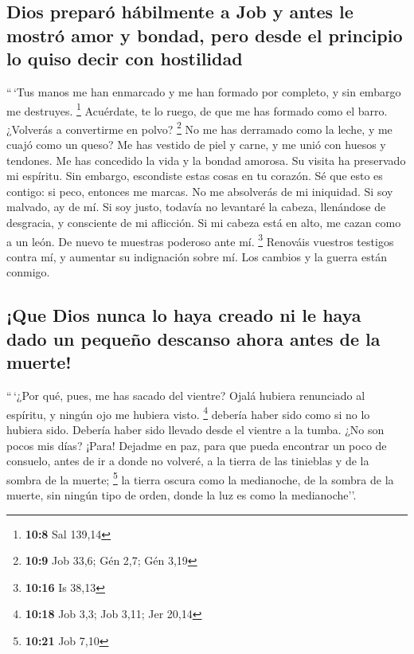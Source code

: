 \begin{paracol}{2}
\hypertarget{dios-preparuxf3-huxe1bilmente-a-job-y-antes-le-mostruxf3-amor-y-bondad-pero-desde-el-principio-lo-quiso-decir-con-hostilidad}{%
\subsection{Dios preparó hábilmente a Job y antes le mostró amor y
bondad, pero desde el principio lo quiso decir con
hostilidad}\label{dios-preparuxf3-huxe1bilmente-a-job-y-antes-le-mostruxf3-amor-y-bondad-pero-desde-el-principio-lo-quiso-decir-con-hostilidad}}

 ``\,`Tus manos me han enmarcado y me han formado por
completo, y sin embargo me destruyes. \footnote{\textbf{10:8} Sal 139,14}
 Acuérdate, te lo ruego, de que me has formado como el
barro. ¿Volverás a convertirme en polvo? \footnote{\textbf{10:9} Job
  33,6; Gén 2,7; Gén 3,19}  No me has derramado como la
leche, y me cuajó como un queso?  Me has vestido de piel
y carne, y me unió con huesos y tendones.  Me has
concedido la vida y la bondad amorosa. Su visita ha preservado mi
espíritu.  Sin embargo, escondiste estas cosas en tu
corazón. Sé que esto es contigo:  si peco, entonces me
marcas. No me absolverás de mi iniquidad.  Si soy
malvado, ay de mí. Si soy justo, todavía no levantaré la cabeza,
llenándose de desgracia, y consciente de mi aflicción. 
Si mi cabeza está en alto, me cazan como a un león. De nuevo te muestras
poderoso ante mí. \footnote{\textbf{10:16} Is 38,13} 
Renováis vuestros testigos contra mí, y aumentar su indignación sobre
mí. Los cambios y la guerra están conmigo.

\hypertarget{que-dios-nunca-lo-haya-creado-ni-le-haya-dado-un-pequeuxf1o-descanso-ahora-antes-de-la-muerte}{%
\subsection{¡Que Dios nunca lo haya creado ni le haya dado un pequeño
descanso ahora antes de la
muerte!}\label{que-dios-nunca-lo-haya-creado-ni-le-haya-dado-un-pequeuxf1o-descanso-ahora-antes-de-la-muerte}}

 ``\,`¿Por qué, pues, me has sacado del vientre? Ojalá
hubiera renunciado al espíritu, y ningún ojo me hubiera visto.
\footnote{\textbf{10:18} Job 3,3; Job 3,11; Jer 20,14} 
debería haber sido como si no lo hubiera sido. Debería haber sido
llevado desde el vientre a la tumba.  ¿No son pocos mis
días? ¡Para! Dejadme en paz, para que pueda encontrar un poco de
consuelo,  antes de ir a donde no volveré, a la tierra de
las tinieblas y de la sombra de la muerte; \footnote{\textbf{10:21} Job
  7,10}  la tierra oscura como la medianoche, de la
sombra de la muerte, sin ningún tipo de orden, donde la luz es como la
medianoche''.


\end{paracol}
